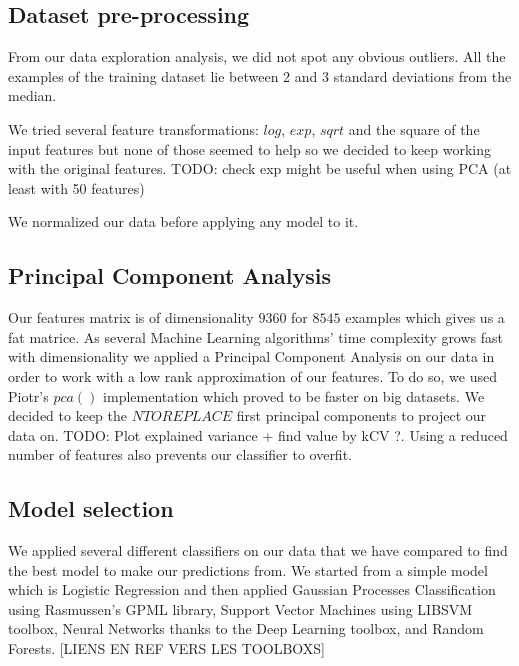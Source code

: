\documentclass{article}
\begin{document}
    \subsection{Dataset pre-processing}
  From our data exploration analysis, we did not spot any obvious outliers. All the examples of the training dataset lie between 2 and 3 standard deviations from the median.

  We tried several feature transformations: $log$, $exp$, $sqrt$ and the square of the input features but none of those seemed to help so we decided to keep working with the original features.
  TODO: check exp might be useful when using PCA (at least with 50 features)

  We normalized our data before applying any model to it.

  \subsection{Principal Component Analysis}
  Our features matrix is of dimensionality $9360$ for $8545$ examples which gives us a fat matrice. As several Machine Learning algorithms' time complexity grows fast with dimensionality we applied a Principal Component Analysis on our data in order to work with a low rank approximation of our features. To do so, we used Piotr's $pca()$ implementation which proved to be faster on big datasets. We decided to keep the $NTOREPLACE$ first principal components to project our data on. TODO: Plot explained variance + find value by kCV ?.
  Using a reduced number of features also prevents our classifier to overfit.

   \subsection{Model selection}
   We applied several different classifiers on our data that we have compared to find the best model to make our predictions from. We started from a simple model which is Logistic Regression and then applied Gaussian Processes Classification using Rasmussen's GPML library, Support Vector Machines using LIBSVM toolbox, Neural Networks thanks to the Deep Learning toolbox, and Random Forests. [LIENS EN REF VERS LES TOOLBOXS]
\end{document}
